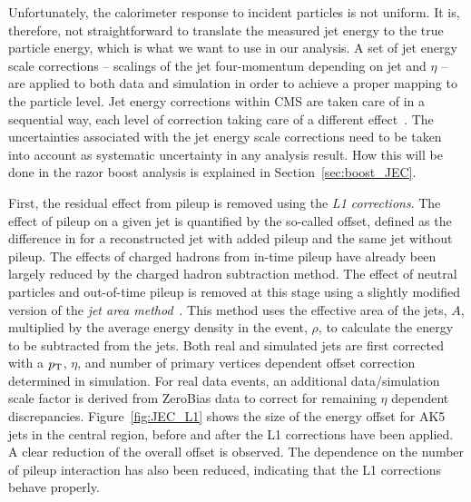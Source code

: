 Unfortunately, the calorimeter response to incident particles is not uniform. It is, therefore, not
straightforward to translate the measured jet energy to the true particle energy, which is what we
want to use in our analysis. A set of jet energy scale corrections -- scalings of the
jet four-momentum depending on jet \pt and $\eta$ -- are applied to both data and
simulation in order to achieve a proper mapping to the particle level. 
Jet energy corrections within CMS are taken care of in a sequential way, each level of correction
taking care of a different effect~\cite{JEC,Chatrchyan:2011ds}. 
The uncertainties associated with the jet energy scale corrections need to be taken into account as
systematic uncertainty in any analysis result. How this will be done in the razor boost analysis is
explained in Section~\ref{sec:boost_JEC}.  

First, the residual effect from pileup is removed using the \textit{L1 corrections}. 
The effect of pileup on a given jet is quantified by the so-called offset, defined as the
difference in \pt for a reconstructed jet with added pileup and the same jet without pileup.
The effects of charged hadrons from in-time pileup have already been largely reduced by the charged
hadron subtraction method. The effect of neutral particles and out-of-time pileup is removed at this
stage using a slightly modified version of the \textit{jet area method}~\cite{Fastjet1,Fastjet2}.
This method uses the effective area of the jets, $A$, multiplied by the average energy density
in the event, $\rho$, to calculate the energy to be subtracted from the jets.
Both real and simulated jets are first corrected with a $p_{\mathrm{T}}$, $\eta$, and number of primary
vertices dependent offset correction determined in simulation. For real data events, an additional
data/simulation scale factor is derived from ZeroBias data to correct for remaining $\eta$ dependent
discrepancies.
Figure~\ref{fig:JEC_L1} shows the size of the energy offset for AK5 jets in the central region,
before and after the L1 corrections have been applied. A clear reduction of the overall offset is
observed. The dependence on the number of pileup interaction has also been reduced, indicating that
the L1 corrections behave properly.  

